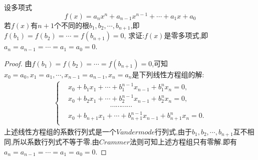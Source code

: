 \documentclass[lang=cn,newtx,10pt,scheme=chinese]{elegantbook}
\begin{document}
\begin{proposition}\label{proposition:多项式根的有限性}
    设多项式
    \[
    f(x)=a_nx^n + a_{n - 1}x^{n - 1}+\cdots+a_1x + a_0
    \]
    若\(f(x)\)有\(n + 1\)个不同的根\(b_1,b_2,\cdots,b_{n+1}\),即\(f(b_1)=f(b_2)=\cdots=f(b_{n+1})=0\),
    求证:\(f(x)\)是零多项式,即\(a_n=a_{n - 1}=\cdots=a_1=a_0 = 0\).
\end{proposition}
\begin{proof}
    由\(f(b_1)=f(b_2)=\cdots=f(b_{n+1})=0\),可知$x_0=a_0,x_1=a_1,\cdots ,x_{n-1}=a_{n-1},x_n=a_n$是下列线性方程组的解:
    \begin{align*}
        \left\{ \begin{aligned}
            &x_0+b_1x_1+\cdots +b_{1}^{n-1}x_{n-1}+b_{1}^{n}x_n=0,\\
            &x_0+b_2x_1+\cdots +b_{2}^{n-1}x_{n-1}+b_{2}^{n}x_n=0,\\
            &\qquad \qquad \qquad \cdots \cdots \cdots \cdots\\
            &x_0+b_{n+1}x_1+\cdots +b_{n+1}^{n-1}x_{n-1}+b_{n+1}^{n}x_n=0.\\
        \end{aligned} \right. 
    \end{align*}
上述线性方程组的系数行列式是一个$Vandermode$行列式,由于$b_1,b_2,\cdots,b_{n+1}$互不相同,所以系数行列式不等于零.由$Crammer$法则可知上述方程组只有零解.即有$a_n=a_{n - 1}=\cdots=a_1=a_0 = 0$.
\end{proof}
\end{document}
